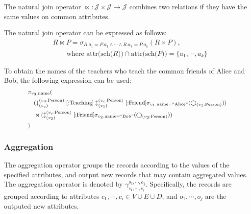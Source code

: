 \begin{definition}
    The natural join operator $\Join : \mathcal{J} \times \mathcal{J} \rightarrow \mathcal{J}$ combines two relations if they have the same values on common attributes.
\end{definition}

The natural join operator can be expressed as follows:
\begin{equation*}
    \begin{split}
        & R \Join P = \sigma_{R.a_1 = P.a_1 \land \cdots \land R.a_k = P.a_k}(R \times P), \\
        & \hspace{2em} \text{where } \text{attr(sch($R$))} \cap \text{attr(sch($P$))} = \{a_1, \cdots, a_k\}
    \end{split}
\end{equation*}

\begin{example}
    To obtain the names of the teachers who teach the common friends of Alice and Bob, the following expression can be used:
    \begin{equation*}
        \footnotesize
        \begin{split}
            & \pi_{v_3\text{.name}}( \\
            & \hspace{1em} (\downarrow_{(v_c)}^{(v_3\text{:Person})}[\text{:Teaching}]\updownarrow_{(v_1)}^{(v_c\text{:Person})}[\text{:Friend}]\sigma_{v_1\text{.name=``Alice''}}(\bigcirc_{(v_1\text{:Person})})) \\
            & \hspace{1em} \Join (\updownarrow_{(v_2)}^{(v_c\text{:Person})}[\text{:Friend}]\sigma_{v_2\text{.name=``Bob''}}(\bigcirc_{(v_2\text{:Person})}))\\ 
            & )
        \end{split}
    \end{equation*}
\end{example}

\subsubsection{Aggregation}
The aggregation operator groups the records according to the values of the specified attributes, and output new records that may contain aggregated values.
The aggregation operator is denoted by $\gamma_{c_1, \cdots, c_i}^{o_1, \cdots, o_j}$.
Specifically, the records are grouped according to attributes $c_1, \cdots, c_i \in V \cup E \cup D$, and $o_1, \cdots, o_j$ are the outputed new attributes.

